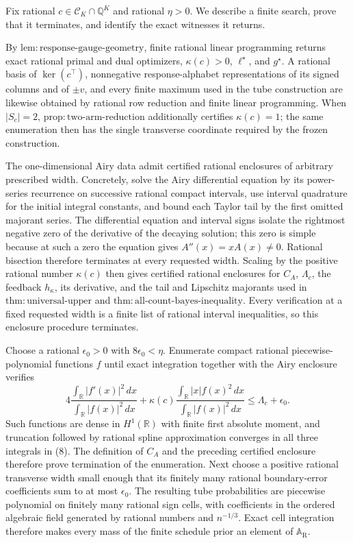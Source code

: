 Fix rational \(c\in\mathcal C_K\cap\mathbb Q^K\) and rational \(\eta>0\).  We describe a finite search, prove that it terminates, and identify the exact witnesses it returns.

By \(\mathrm{lem:response\text{-}gauge\text{-}geometry}\), finite rational linear programming returns exact rational primal and dual optimizers, \(\kappa(c)>0\), \(\ell^\star\), and \(g^\star\).  A rational basis of \(\ker(c^\top)\), nonnegative response-alphabet representations of its signed columns and of \(\pm v\), and every finite maximum used in the tube construction are likewise obtained by rational row reduction and finite linear programming.  When \(|S_c|=2\), \(\mathrm{prop:two\text{-}arm\text{-}reduction}\) additionally certifies \(\kappa(c)=1\); the same enumeration then has the single transverse coordinate required by the frozen construction.

The one-dimensional Airy data admit certified rational enclosures of arbitrary prescribed width.  Concretely, solve the Airy differential equation by its power-series recurrence on successive rational compact intervals, use interval quadrature for the initial integral constants, and bound each Taylor tail by the first omitted majorant series.  The differential equation and interval signs isolate the rightmost negative zero of the derivative of the decaying solution; this zero is simple because at such a zero the equation gives \(A''(x)=xA(x)\ne0\).  Rational bisection therefore terminates at every requested width.  Scaling by the positive rational number \(\kappa(c)\) then gives certified rational enclosures for \(C_A\), \(\Lambda_c\), the feedback \(h_\kappa\), its derivative, and the tail and Lipschitz majorants used in \(\mathrm{thm:universal\text{-}upper}\) and \(\mathrm{thm:all\text{-}count\text{-}bayes\text{-}inequality}\).  Every verification at a fixed requested width is a finite list of rational interval inequalities, so this enclosure procedure terminates.

Choose a rational \(\epsilon_0>0\) with \(8\epsilon_0<\eta\).  Enumerate compact rational piecewise-polynomial functions \(f\) until exact integration together with the Airy enclosure verifies
\[
4\frac{\int_{\mathbb R}|f'(x)|^2\,dx}{\int_{\mathbb R}|f(x)|^2\,dx}
+\kappa(c)\frac{\int_{\mathbb R}|x|f(x)^2\,dx}{\int_{\mathbb R}|f(x)|^2\,dx}
\le \Lambda_c+\epsilon_0.
\tag{8}
\]
Such functions are dense in \(H^1(\mathbb R)\) with finite first absolute moment, and truncation followed by rational spline approximation converges in all three integrals in (8).  The definition of \(C_A\) and the preceding certified enclosure therefore prove termination of the enumeration.  Next choose a positive rational transverse width small enough that its finitely many rational boundary-error coefficients sum to at most \(\epsilon_0\).  The resulting tube probabilities are piecewise polynomial on finitely many rational sign cells, with coefficients in the ordered algebraic field generated by rational numbers and \(n^{-1/3}\).  Exact cell integration therefore makes every mass of the finite schedule prior an element of \(\mathbb A_{\mathrm R}\).


